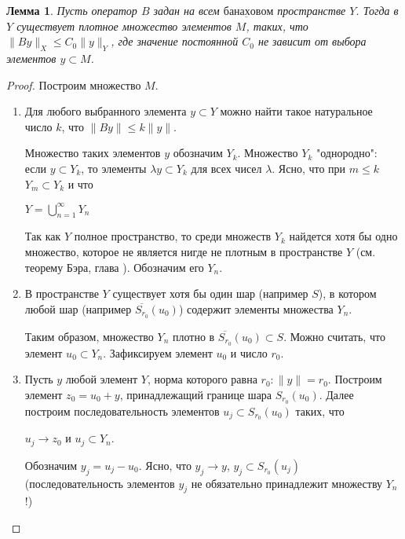 \documentclass[12pt,a4paper,titlepage]{book}
\theoremstyle{definition}
\theoremstyle{plain}
\theoremstyle{remark}
\theoremstyle{remark}
\theoremstyle{remark}
\theoremstyle{plain}
\newtheorem*{lemma}{Лемма}
\begin{document}
\begin{lemma}
Пусть оператор $B$ задан на всем $\underbar {банаховом}$ пространстве $Y$. Тогда в $Y$ существует плотное множество элементов $M$, таких, что $\lVert By\rVert_X \leq C_0\lVert y\rVert_Y $, где значение постоянной $C_0$ не зависит от выбора элементов $y \subset M$.
\end{lemma}

\begin{proof}
	
Построим множество $M$.

\begin{enumerate}
	\item Для любого выбранного элемента $y \subset Y$ можно найти такое натуральное число $k$, что $\lVert By\rVert \leq k\lVert y\rVert$.
	
	Множество таких элементов $y$ обозначим $Y_k$. Множество $Y_k$ "однородно": если $y \subset Y_k$, то элементы $\lambda y \subset Y_k$ для всех чисел $\lambda$. Ясно, что при $m \leq k$ $Y_m \subset Y_k$ и что

\begin{center}	

	$Y=\bigcup\limits_{n=1}^\infty Y_n$
	
\end{center}
	
	Так как $Y$ полное пространство, то среди множеств $Y_k$ найдется хотя бы одно множество, которое не является нигде не плотным в пространстве $Y$ (см. теорему Бэра, глава \uppercase\expandafter{}). Обозначим его $Y_n$.
	
	\item В пространстве $Y$ существует хотя бы один шар (например $S$), в котором любой шар (например $\overline{S_{r_0}}(u_0)$) содержит элементы множества $Y_n$.
	
	Таким образом, множество $Y_n$ плотно в $\overline{S_{r_0}}(u_0)\subset S$. Можно считать, что элемент $u_0 \subset Y_n$. Зафиксируем элемент $u_0$ и число $r_0$.
	
	\item Пусть $y$ любой элемент $Y$, норма которого равна $r_0:\lVert y\rVert=r_0$. Построим элемент $z_0=u_0+y$, принадлежащий границе шара $S_{r_0}(u_0)$. Далее построим последовательность элементов $u_j \subset S_{r_0}(u_0)$ таких, что

\begin{center}	

	$u_j \rightarrow z_0$ и $u_j \subset Y_n$.
	
\end{center}

Обозначим $y_j=u_j-u_0$. Ясно, что $y_j \rightarrow y$, $y_j \subset S_{r_0}(u_j)$ (последовательность элементов $y_j$ не обязательно принадлежит множеству $Y_n$!)
	
\end{enumerate}
	
\end{proof}
\end{document}
